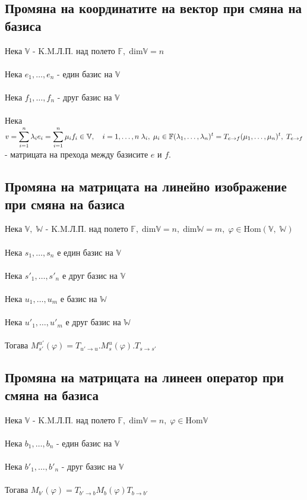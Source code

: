 \documentclass{article}
\newcommand{\V}{\mathbb{V}}
\newcommand{\F}{\mathbb{F}}
\newcommand{\W}{\mathbb{W}}
\newcommand{\n}[1]{#1_1, \dots, #1_n}
\newcommand{\m}[1]{#1_1, \dots, #1_m}
\newcommand{\ieqn}{i = 1, \dots, n}
\begin{document}
    \subsection{Промяна на координатите на вектор при смяна на базиса}
    Нека \(\V\) - K.M.Л.П. над полето \(\F, \; \mathrm{dim}\V = n\) \\\\
    Нека \(\n{e}\) - един базис на \(\V\) \\\\
    Нека \(\n{f}\) - друг базис на \(\V\) \\\\
    Нека \(v = \displaystyle\sum_{i = 1}^n \lambda_i e_i = \displaystyle\sum_{i = 1}^n \mu_i f_i \in \V, \quad \ieqn \; \lambda_i, \; \mu_i \in \F \\\\
    (\n{\lambda})^t = T_{e \to f}(\n{\mu})^t, \; T_{e \to f}\) - матрицата на прехода между базисите \(e\) и \(f\).
    \subsection{Промяна на матрицата на линейно изображение при смяна на базиса}
    Нека \(\V, \; \W\) - K.M.Л.П. над полето \(\F, \; \mathrm{dim}\V = n, \; \mathrm{dim}\W = m, \; \varphi \in \mathrm{Hom}(\V, \; \W)\) \\\\
    Нека \(\n{s}\) е един базис на \(\V\) \\\\
    Нека \(\n{s'}\) е друг базис на \(\V\) \\\\
    Нека \(\m{u}\) е базис на \(\W\) \\\\
    Нека \(\m{u'}\) е друг базис на \(\W\) \\\\
    Тогава \(M_{s'}^{u'}(\varphi) = T_{u' \to u}.M_s^u(\varphi).T_{s \to s'}\)
    \subsection{Промяна на матрицата на линеен оператор при смяна на базиса}
    Нека \(\V\) - K.M.Л.П. над полето \(\F, \; \mathrm{dim}\V = n, \; \varphi \in \mathrm{Hom}\V\) \\\\
    Нека \(\n{b}\) - един базис на \(\V\) \\\\
    Нека \(\n{b'}\) - друг базис на \(\V\) \\\\
    Тогава \(M_{b'}(\varphi) = T_{b' \to b}M_b(\varphi)T_{b \to b'}\)
\end{document}

